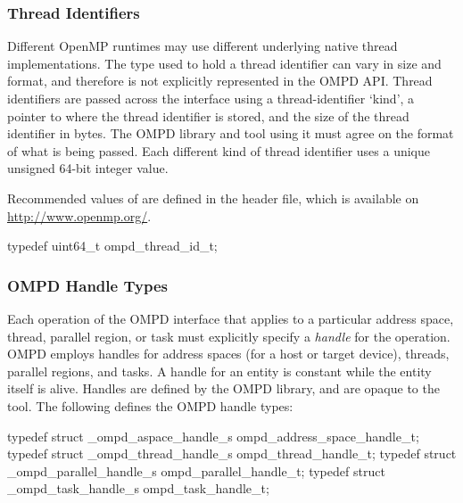 \subsubsection{Thread Identifiers}

Different OpenMP runtimes may use different underlying native
thread implementations.
The type used to hold a thread identifier can vary in size and format, and
therefore is not explicitly represented in the OMPD API. Thread identifiers are
passed across the interface using a thread-identifier `kind', a pointer to where
the thread identifier is stored, and the size of the thread identifier in bytes.
The OMPD library and tool using it must agree on the format
of what is being passed.
Each different kind of thread identifier uses a unique
unsigned 64-bit integer value.

Recommended values of  are defined in the 
header file, which is available on \url{http://www.openmp.org/}.

\label{ompd:ompd_thread_id_t}
\format

\begin{ccppspecific}
\begin{ompSyntax}
typedef uint64_t ompd_thread_id_t;
\end{ompSyntax}
\end{ccppspecific}


\subsubsection{OMPD Handle Types}
\label{subsubsec:ompd_address_space_handle_t}
\label{subsubsec:ompd_thread_handle_t}
\label{subsubsec:ompd_parallel_handle_t}
\label{subsubsec:ompd_task_handle_t}

Each operation of the OMPD interface that applies to a particular address space, thread, parallel
region, or task must explicitly specify
a \emph{handle} for the operation.
OMPD employs handles for address spaces (for a host or target device), threads, parallel regions,
and tasks. A handle for an entity is constant while the entity itself is alive. Handles are defined by
the OMPD library, and are opaque to the tool. The following defines the OMPD
handle types:

\format

\begin{ccppspecific}
\begin{ompSyntax}
typedef struct _ompd_aspace_handle_s
   ompd_address_space_handle_t;
typedef struct _ompd_thread_handle_s ompd_thread_handle_t;
typedef struct _ompd_parallel_handle_s ompd_parallel_handle_t;
typedef struct _ompd_task_handle_s ompd_task_handle_t;
\end{ompSyntax}
\end{ccppspecific}


